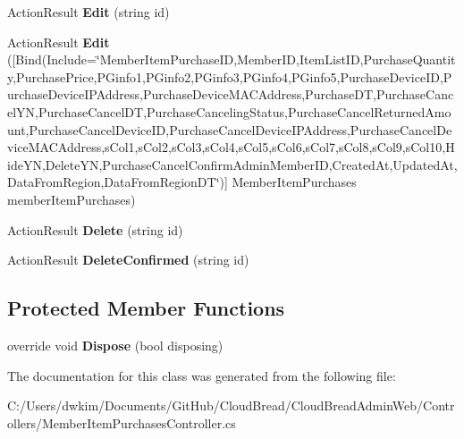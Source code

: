 \begin{DoxyCompactItemize}
\item 
Action\+Result {\bfseries Edit} (string id)\hypertarget{a00142_a465a7d320582011642549fd1ee216fde}{}\label{a00142_a465a7d320582011642549fd1ee216fde}

\item 
Action\+Result {\bfseries Edit} (\mbox{[}Bind(Include=\char`\"{}Member\+Item\+Purchase\+ID,Member\+ID,Item\+List\+ID,Purchase\+Quantity,Purchase\+Price,P\+Ginfo1,P\+Ginfo2,P\+Ginfo3,P\+Ginfo4,P\+Ginfo5,Purchase\+Device\+ID,Purchase\+Device\+I\+P\+Address,Purchase\+Device\+M\+A\+C\+Address,Purchase\+DT,Purchase\+Cancel\+YN,Purchase\+Cancel\+DT,Purchase\+Canceling\+Status,Purchase\+Cancel\+Returned\+Amount,Purchase\+Cancel\+Device\+ID,Purchase\+Cancel\+Device\+I\+P\+Address,Purchase\+Cancel\+Device\+M\+A\+C\+Address,s\+Col1,s\+Col2,s\+Col3,s\+Col4,s\+Col5,s\+Col6,s\+Col7,s\+Col8,s\+Col9,s\+Col10,Hide\+YN,Delete\+YN,Purchase\+Cancel\+Confirm\+Admin\+Member\+ID,Created\+At,Updated\+At,Data\+From\+Region,Data\+From\+Region\+DT\char`\"{})\mbox{]} Member\+Item\+Purchases member\+Item\+Purchases)\hypertarget{a00142_a2a260038127b2200087967d4b7a09ce8}{}\label{a00142_a2a260038127b2200087967d4b7a09ce8}

\item 
Action\+Result {\bfseries Delete} (string id)\hypertarget{a00142_ab8ba18ed303970ee91b53d609ab0c131}{}\label{a00142_ab8ba18ed303970ee91b53d609ab0c131}

\item 
Action\+Result {\bfseries Delete\+Confirmed} (string id)\hypertarget{a00142_a15ed8b16dd799c9d2d1b7d5e98846dcc}{}\label{a00142_a15ed8b16dd799c9d2d1b7d5e98846dcc}

\end{DoxyCompactItemize}
\subsection*{Protected Member Functions}
\begin{DoxyCompactItemize}
\item 
override void {\bfseries Dispose} (bool disposing)\hypertarget{a00142_a05712c8dbf18f1f823746e1a94fa70ec}{}\label{a00142_a05712c8dbf18f1f823746e1a94fa70ec}

\end{DoxyCompactItemize}


The documentation for this class was generated from the following file\+:\begin{DoxyCompactItemize}
\item 
C\+:/\+Users/dwkim/\+Documents/\+Git\+Hub/\+Cloud\+Bread/\+Cloud\+Bread\+Admin\+Web/\+Controllers/Member\+Item\+Purchases\+Controller.\+cs\end{DoxyCompactItemize}
